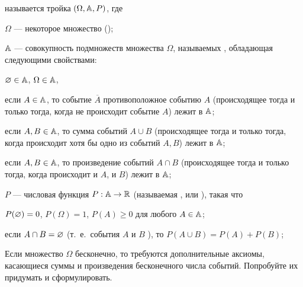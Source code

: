 \documentclass[a4paper,12pt]{article}
\begin{document}
{\small
{}  называется тройка $(\Omega ,\mathbb{A}, P)$, где
\begin{items}{-4}
    \item[$\Omega $] --- некоторое множество ();
    \item[$\mathbb{A}$] --- совокупность подмножеств множества $\Omega$,
    называемых , обладающая следующими свойствами:
    \begin{nums}{-4}
        \item $\varnothing \in \mathbb{A}$, $\Omega \in \mathbb{A}$,
        \item если $A \in \mathbb{A}$, то событие $\overline {A}$  противоположное событию $A$ (происходящее тогда и только тогда, когда не происходит событие $A$) лежит в $\mathbb{A}$;
        \item если $A,B \in \mathbb{A}$, то  сумма событий $A\cup B$ (происходящее тогда и только тогда, когда происходит хотя бы одно из событий $A, B$) лежит в $\mathbb{A}$;
        \item если $A,B \in \mathbb{A}$, то  произведение событий $A\cap B$ (происходящее тогда и только тогда, когда происходит и $A$, и $B$) лежит в $\mathbb{A}$;
    \end{nums}
    \item[$P$] --- числовая функция $P:\mathbb{A}\rightarrow {\Bbb R}$ (называемая , или ), такая что
    \begin{nums}{-4}
        \item $P(\varnothing)=0$, $P(\Omega)=1$, $P(A)\ge 0$ для любого $A \in \mathbb{A}$;
        \item {} если $A\cap B=\varnothing$ (т.~е.~события $A$ и $B$ ), то $P(A\cup B)=P(A)+P(B)$;
    \end{nums}
\end{items}
}

\vspace*{-3mm}
    Если множество $\Omega$ бесконечно, то требуются дополнительные аксиомы, касающиеся суммы и произведения бесконечного числа событий.
    Попробуйте их придумать и сформулировать.
\end{document}
